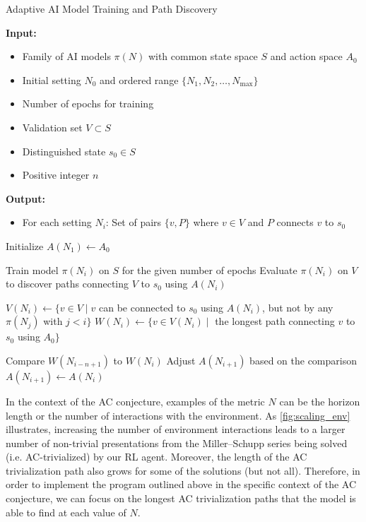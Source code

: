 \begin{algorithm}
	\caption{Adaptive AI Model Training and Path Discovery}
	\label{alg:adaptive_ai_model}
	\begin{algorithmic}[1]
		\State \textbf{Input:}
		\begin{itemize}
			\item[] Family of AI models $\pi(N)$ with common state space $S$ and action space $A_0$
			\item[] Initial setting $N_0$ and ordered range $\{N_1, N_2, \ldots, N_{\text{max}}\}$
			\item[] Number of epochs for training
			\item[] Validation set $V \subset S$
			\item[] Distinguished state $s_0 \in S$
			\item[] Positive integer $n$
		\end{itemize}

		\State \textbf{Output:}
		\begin{itemize}
			\item[] For each setting $N_i$: Set of pairs $\{v, P\}$ where $v \in V$ and $P$ connects $v$ to $s_0$
		\end{itemize}

		\State Initialize $A(N_1) \gets A_0$

		\State Train model $\pi(N_i)$ on $S$ for the given number of epochs
		\State Evaluate $\pi(N_i)$ on $V$ to discover paths connecting $V$ to $s_0$ using $A(N_i)$

		\State $V(N_i) \gets \{ v \in V \mid v$ can be connected to $s_0$ using $A(N_i)$, but not by any $\pi(N_j)$ with $j < i\}$
		\State $W(N_i) \gets \{ v \in V(N_i) \mid$ the longest path connecting $v$ to $s_0$ using $A_0 \}$

		\State Compare $W(N_{i-n+1})$ to $W(N_i)$
		\State Adjust $A(N_{i+1})$ based on the comparison
		\Else
		\State $A(N_{i+1}) \gets A(N_i)$
		\EndIf
		\EndFor
	\end{algorithmic}
\end{algorithm}

In the context of the AC conjecture, examples of the metric $N$ can be the horizon length or the number of interactions with the environment. As \autoref{fig:scaling_env} illustrates, increasing the number of environment interactions leads to a larger number of non-trivial presentations from the Miller--Schupp series being solved (i.e. AC-trivialized) by our RL agent. Moreover, the length of the AC trivialization path also grows for some of the solutions (but not all).
%
Therefore, in order to implement the program outlined above in the specific context of the AC conjecture, we can focus on the longest AC trivialization paths that the model is able to find at each value of $N$.

